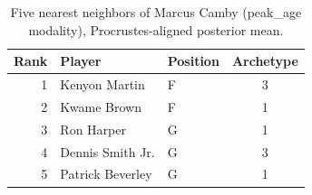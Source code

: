 \begin{table}[htbp]
  \centering\small
  \begin{tabular}{rllc}
    \toprule
    Rank & Player & Position & Archetype \\
    \midrule
    1 & Kenyon Martin & F & 3 \\
    2 & Kwame Brown & F & 1 \\
    3 & Ron Harper & G & 1 \\
    4 & Dennis Smith Jr. & G & 3 \\
    5 & Patrick Beverley & G & 1 \\
    \bottomrule
  \end{tabular}
  \caption{Five nearest neighbors of Marcus Camby (peak_age modality), Procrustes-aligned posterior mean.}
  \label{tab:Marcus_Camby_neighbors_peak_age}
\end{table}

